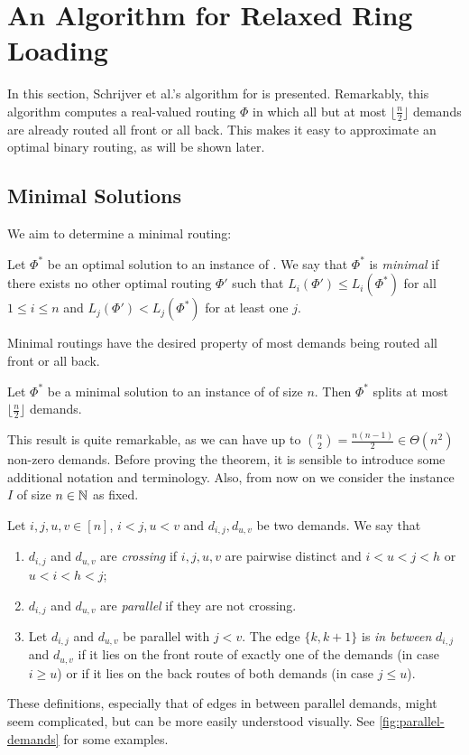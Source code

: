 \section{An Algorithm for Relaxed Ring Loading}
\label{sec:relaxed-ring-loading}

In this section, Schrijver et al.'s \cite{schrijver99} algorithm for \RRL is presented.
Remarkably, this algorithm computes a real-valued routing $\Phi$ in which all but at most $\lfloor \frac{n}{2} \rfloor$ demands are already routed all front or all back.
This makes it easy to approximate an optimal binary routing, as will be shown later.

\subsection{Minimal Solutions}

We aim to determine a minimal routing:

\begin{definition}
	Let $\Phi^\ast$ be an optimal solution to an instance of \RRL.
	We say that $\Phi^\ast$ is \emph{minimal} if there exists no other optimal routing $\Phi'$ such that $L_i(\Phi') \leq L_i(\Phi^\ast)$ for all $1 \leq i \leq n$ and $L_j(\Phi') < L_j(\Phi^\ast)$ for at least one $j$.
\end{definition}

Minimal routings have the desired property of most demands being routed all front or all back.
\begin{theorem}
	\label{theo:number-of-splits}
	Let $\Phi^\ast$ be a minimal solution to an instance of \RRL of size $n$.
	Then $\Phi^\ast$ splits at most $\lfloor \frac{n}{2} \rfloor$ demands.
\end{theorem}

This result is quite remarkable, as we can have up to $\binom{n}{2} = \frac{n(n-1)}{2} \in \Theta(n^2)$ non-zero demands.
Before proving the theorem, it is sensible to introduce some additional notation and terminology.
Also, from now on we consider the \RRL instance $I$ of size $n \in \mathbb{N}$ as fixed.
\begin{definition}
	Let $i, j, u, v \in [n]$, $i < j, u < v$ and $d_{i,j}, d_{u, v}$ be two demands.
	We say that
	\begin{enumerate}
		\item $d_{i, j}$ and $d_{u, v}$ are \emph{crossing} if $i, j, u, v$ are pairwise distinct and $i < u < j < h$ or $u < i < h < j$;
		\item $d_{i, j}$ and $d_{u, v}$ are \emph{parallel} if they are not crossing.
		\item Let $d_{i, j}$ and $d_{u, v}$ be parallel with $j < v$.
		The edge $\{k, k+1\}$ is \emph{in between} $d_{i,j}$ and $d_{u, v}$ if it lies on the front route of exactly one of the demands (in case $i \geq u$) or if it lies on the back routes of both demands (in case $j \leq u$).
	\end{enumerate}
\end{definition}
These definitions, especially that of edges in between parallel demands, might seem complicated, but can be more easily understood visually.
See \cref{fig:parallel-demands} for some examples.

